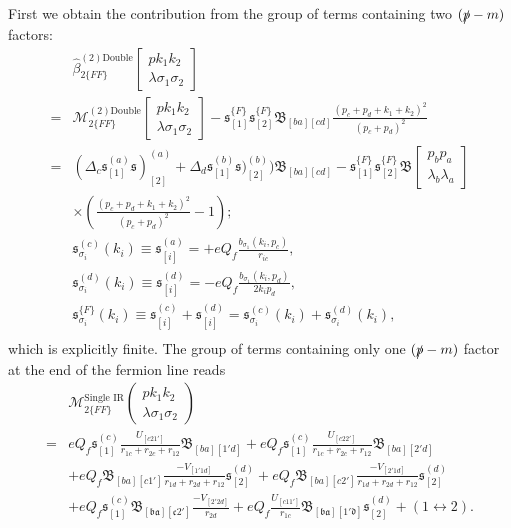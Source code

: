 First we obtain the contribution from the group of terms containing two $(\slashed p-m)$ factors:
\begin{align}
&\hat{\beta}_{2\{FF\}}^{(2)\text{Double}}\left[\begin{array}{c}
pk_1k_2\\\lambda\sigma_1\sigma_2
\end{array}\right]\nonumber\\
=&\mathcal{M}_{2\{FF\}}^{(2)\text{Double}}\left[\begin{array}{c}
pk_1k_2\\\lambda\sigma_1\sigma_2
\end{array}\right]-\mathfrak{s}^{\{F\}}_{[1]}\mathfrak{s}^{\{F\}}_{[2]}\mathfrak{B}_{[ba][cd]}\frac{(p_c+p_d+k_1+k_2)^2}{(p_c+p_d)^2}\nonumber\\
=&(\Delta_c\mathfrak{s}^{(a)}_{[1]}\mathfrak{s})^{(a)}_{[2]}+\Delta_d\mathfrak{s}^{(b)}_{[1]}\mathfrak{s})^{(b)}_{[2]})\mathfrak{B}_{[ba][cd]}-\mathfrak{s}^{\{F\}}_{[1]}\mathfrak{s}^{\{F\}}_{[2]}\mathfrak{B}\left[\begin{array}{c}
p_bp_a\\\lambda_b\lambda_a
\end{array}\right]\nonumber\\
&\times\left(\frac{(p_c+p_d+k_1+k_2)^2}{(p_c+p_d)^2}-1\right);\nonumber\\
&\mathfrak{s}^{(c)}_{\sigma_i}(k_i)\equiv\mathfrak{s}^{(a)}_{[i]}=+eQ_f\frac{b_{\sigma_1}(k_i,p_c)}{r_{ic}},\nonumber\\
&\mathfrak{s}^{(d)}_{\sigma_i}(k_i)\equiv\mathfrak{s}^{(d)}_{[i]}=-eQ_f\frac{b_{\sigma_1}(k_i,p_d)}{2k_ip_d},\nonumber\\
&\mathfrak{s}^{\{F\}}_{\sigma_i}(k_i)\equiv\mathfrak{s}^{(c)}_{[i]}+\mathfrak{s}^{(d)}_{[i]}=\mathfrak{s}^{(c)}_{\sigma_i}(k_i)+\mathfrak{s}^{(d)}_{\sigma_i}(k_i),\nonumber\\
\end{align}
which is explicitly finite. The group of terms containing only one $(\slashed p-m)$ factor at the end of the fermion line reads
\begin{align}
&\mathcal{M}^\text{Single IR}_{2\{FF\}}\left(\begin{array}{c}
pk_1k_2\\\lambda\sigma_1\sigma_2
\end{array}\right)\nonumber\\
=&eQ_f\mathfrak{s}^{(c)}_{[1]}\frac{U_{[c21']}}{r_{1c}+r_{2c}+r_{12}}\mathfrak{B}_{[ba][1'd]} + eQ_f\mathfrak{s}^{(c)}_{[1]}\frac{U_{[c22']}}{r_{1c}+r_{2c}+r_{12}}\mathfrak{B}_{[ba][2'd]}\nonumber\\
&+eQ_f\mathfrak{B}_{[ba][c1']}\frac{-V_{[1'1d]}}{r_{1d}+r_{2d}+r_{12}}\mathfrak{s}^{(d)}_{[2]} + eQ_f\mathfrak{B}_{[ba][c2']}\frac{-V_{[2'1d]}}{r_{1d}+r_{2d}+r_{12}}\mathfrak{s}^{(d)}_{[2]}\nonumber\\
&+eQ_f\mathfrak{s}^{(c)}_{[1]}\mathfrak{B_{[ba][c2']}}\frac{-V_{[2'2d]}}{r_{2d}}+eQ_f\frac{U_{[c11']}}{r_{1c}}\mathfrak{B_{[ba][1'd]}}\mathfrak{s}^{(d)}_{[2]}+(1\leftrightarrow 2).
\end{align}
